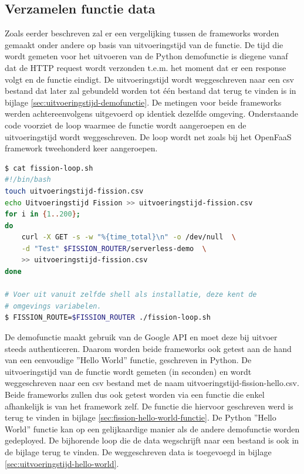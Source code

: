 \subsection{Verzamelen functie data}
Zoals eerder beschreven zal er een vergelijking tussen de frameworks worden gemaakt onder andere op basis van uitvoeringstijd van de functie. De tijd die wordt gemeten voor het uitvoeren van de Python demofunctie is diegene vanaf dat de HTTP request wordt verzonden t.e.m. het moment dat er een response volgt en de functie eindigt. De uitvoeringstijd wordt weggeschreven naar een csv bestand dat later zal gebundeld worden tot één bestand dat terug te vinden is in bijlage \ref{sec:uitvoeringstijd-demofunctie}. De metingen voor beide frameworks werden achtereenvolgens uitgevoerd op identiek dezelfde omgeving. Onderstaande code voorziet de loop waarmee de functie wordt aangeroepen en de uitvoeringstijd wordt weggeschreven. De loop wordt net zoals bij het OpenFaaS framework tweehonderd keer aangeroepen.

\begin{lstlisting}[language=bash]
$ cat fission-loop.sh
#!/bin/bash
touch uitvoeringstijd-fission.csv
echo Uitvoeringstijd Fission >> uitvoeringstijd-fission.csv
for i in {1..200};
do
    curl -X GET -s -w "%{time_total}\n" -o /dev/null  \
    -d "Test" $FISSION_ROUTER/serverless-demo  \
    >> uitvoeringstijd-fission.csv
done

# Voer uit vanuit zelfde shell als installatie, deze kent de 
# omgevings variabelen.
$ FISSION_ROUTE=$FISSION_ROUTER ./fission-loop.sh
\end{lstlisting}

De demofunctie maakt gebruik van de Google API en moet deze bij uitvoer steeds authenticeren. Daarom worden beide frameworks ook getest aan de hand van een eenvoudige ''Hello World'' functie, geschreven in Python. De uitvoeringstijd van de functie wordt gemeten (in seconden) en wordt weggeschreven naar een csv bestand met de naam uitvoeringstijd-fission-hello.csv. Beide frameworks zullen dus ook getest worden via een functie die enkel afhankelijk is van het framework zelf. De functie die hiervoor geschreven werd is terug te vinden in bijlage \ref{sec:fission-hello-world-functie}. De Python ''Hello World'' functie kan op een gelijkaardige manier als de andere demofunctie worden gedeployed. De bijhorende loop die de data wegschrijft naar een bestand is ook in de bijlage terug te vinden. De weggeschreven data is toegevoegd in bijlage \ref{sec:uitvoeringstijd-hello-world}.

